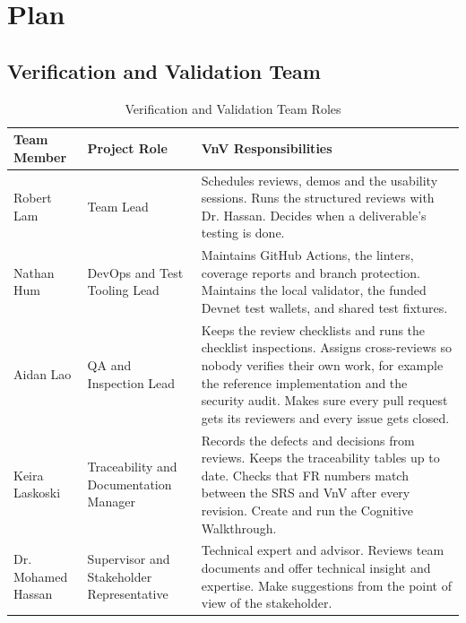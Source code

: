 \documentclass[12pt]{article}
\begin{document}

\section{Plan}


\subsection{Verification and Validation Team}


  \begin{table}[!ht]
  \centering
  \small
  \begin{tabularx}{\textwidth}{|p{2.6cm}|p{3.1cm}|>{\raggedright\arraybackslash}X|}
    \hline
    \textbf{Team Member} & \textbf{Project Role} & \textbf{VnV Responsibilities} \\
    \hline
    Robert Lam & Team Lead & Schedules reviews, demos and the usability sessions. Runs the structured reviews with Dr. Hassan. Decides when a deliverable’s testing is done. \\
    Nathan Hum & DevOps and Test Tooling Lead & Maintains GitHub Actions, the linters, coverage reports and branch protection. Maintains the local validator, the funded Devnet test wallets, and shared test fixtures. \\
    Aidan Lao & QA and Inspection Lead & Keeps the review checklists and runs the checklist inspections. Assigns cross-reviews so nobody verifies their own work, for example the reference implementation and the security audit. Makes sure every pull request gets its reviewers and every issue gets closed. \\
    Keira Laskoski & Traceability and Documentation Manager & Records the defects and decisions from reviews. Keeps the traceability tables up to date. Checks that FR numbers match between the SRS and VnV after every revision. Create and run the Cognitive Walkthrough. \\
    Dr. Mohamed Hassan & Supervisor and Stakeholder Representative & Technical expert and advisor. Reviews team documents and offer technical insight and expertise. Make suggestions from the point of view of the stakeholder. \\
    \hline
  \end{tabularx}
  \caption{Verification and Validation Team Roles}
  \label{tab:mytable}
\end{table}
\end{document}
